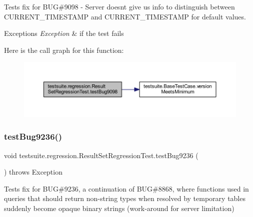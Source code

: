 Tests fix for B\+UG\#9098 -\/ Server doesn\textquotesingle{}t give us info to distinguish between C\+U\+R\+R\+E\+N\+T\+\_\+\+T\+I\+M\+E\+S\+T\+A\+MP and \textquotesingle{}C\+U\+R\+R\+E\+N\+T\+\_\+\+T\+I\+M\+E\+S\+T\+A\+MP\textquotesingle{} for default values.


\begin{DoxyExceptions}{Exceptions}
{\em Exception} & if the test fails \\
\hline
\end{DoxyExceptions}
Here is the call graph for this function\+:
\nopagebreak
\begin{figure}[H]
\begin{center}
\leavevmode
\includegraphics[width=350pt]{classtestsuite_1_1regression_1_1_result_set_regression_test_a73f559230b24a5776a1ce47569f3f82a_cgraph}
\end{center}
\end{figure}
\mbox{\label{classtestsuite_1_1regression_1_1_result_set_regression_test_ad29ed5c9d0749bc7bbdcbbacd1b45910}} 
\subsubsection{\texorpdfstring{test\+Bug9236()}{testBug9236()}}
{\footnotesize\ttfamily void testsuite.\+regression.\+Result\+Set\+Regression\+Test.\+test\+Bug9236 (\begin{DoxyParamCaption}{ }\end{DoxyParamCaption}) throws Exception}

Tests fix for B\+UG\#9236, a continuation of B\+UG\#8868, where functions used in queries that should return non-\/string types when resolved by temporary tables suddenly become opaque binary strings (work-\/around for server limitation)


